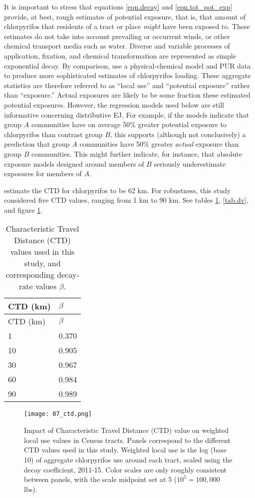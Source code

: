 \documentclass[ijerph,article,submit,oneauthor,pdftex]{Definitions/mdpi}
\begin{document}
It is important to stress that equations \ref{eqn.decay} and \ref{eqn.tot_pot_exp} provide, at best, rough estimates of potential exposure, that is, that amount of chlorpyrifos that residents of a tract or place \emph{might} have been exposed to. These estimates do not take into account prevailing or occurrent winds, or other chemical transport media such as water. Diverse and variable processes of application, fixation, and chemical transformation are represented as simple exponential decay. By comparison, \citet{LuoSpatiallyDistributedPesticide2010} use a physical-chemical model and PUR data to produce more sophisticated estimates of chlorpyrifos loading. These aggregate statistics are therefore referred to as ``local use'' and ``potential exposure'' rather than ``exposure.'' Actual exposures are likely to be some fraction these estimated potential exposures. However, the regression models used below are still informative concerning distributive EJ.  For example, if the models indicate that group $A$ communities have on average 50\% greater potential exposure to chlorpyrifos than contrast group $B$, this supports (although not conclusively) a prediction that group $A$ communities have 50\% greater \emph{actual} exposure than group $B$ communities.  This might further indicate, for instance, that absolute exposure models designed around members of $B$ seriously underestimate exposures for members of $A$. 

\citet{MackayFateEnvironmentLongrange2014} estimate the CTD for chlorpyrifos to be 62 km. For robustness, this study considered five CTD values, ranging from 1 km to 90 km. See tables \ref{tab.ctd}, \ref{tab.dv}, and figure \ref{fig.ctd}.

\begin{longtable}[]{@{}ll@{}}
\caption{Characteristic Travel Distance (CTD) values used in this study, and corresponding decay-rate values \(\beta\). \label{tab.ctd}}\tabularnewline
\toprule
CTD (km) & \(\beta\)\tabularnewline
\midrule
\endfirsthead
\toprule
CTD (km) & \(\beta\)\tabularnewline
\midrule
\endhead
1 & 0.370\tabularnewline
10 & 0.905\tabularnewline
30 & 0.967\tabularnewline
60 & 0.984\tabularnewline
90 & 0.989\tabularnewline
\bottomrule
\end{longtable}

\begin{figure}
\centering
\texttt{[image: 07\_ctd.png]}
\caption{Impact of Characteristic Travel Distance (CTD) value on weighted local use values in Census tracts. Panels correspond to the different CTD values used in this study. Weighted local use is the log (base 10) of aggregate chlorpyrifos use around each tract, scaled using the decay coefficient, 2011-15. Color scales are only roughly consistent between panels, with the scale midpoint set at 5 (\(10^5 = 100,000\) lbs). \label{fig.ctd}}
\end{figure}
\end{document}
